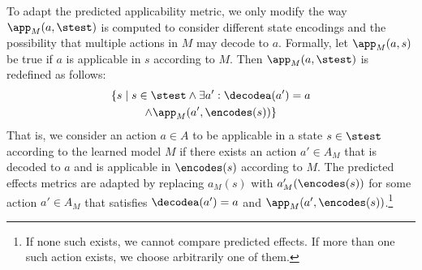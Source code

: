 




To adapt the predicted applicability metric, we only modify the way $\app_M(a,\stest)$ is computed to consider different state encodings and the possibility that multiple actions in $M$ may decode to $a$. 
Formally, let $\app_M(a,s)$ be true if $a$ is applicable in $s$ according to $M$. Then $\app_M(a,\stest)$ is redefined as follows:
\begin{multline}
    \{s \mid s\in\stest  \wedge 
        \exists a': \decodea(a') = a 
        \\ \wedge \app_M(a',\encodes(s))\}        
\end{multline}
That is, we consider an action $a\in A$ to be applicable in a state $s\in\stest$ according to the learned model $M$ if there exists an action $a'\in A_M$ that is decoded to $a$ and is applicable in $\encodes(s)$ according to $M$. 
The predicted effects metrics are adapted 
by replacing $a_M(s)$ with 
$a'_M(\encodes(s))$ 
for some action $a'\in A_M$ that satisfies $\decodea(a')=a$ and 
$\app_M(a',\encodes(s))$.\footnote{If none such exists, we cannot compare predicted effects. If more than one such action exists, we choose arbitrarily one of them.} 

